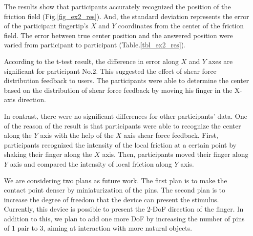 The results show that participants accurately recognized the position of the friction field (Fig.\ref{fig_ex2_res}).
And, the standard deviation represents the error of the participant fingertip's $X$ and $Y$ coordinates from the center of the friction field.
The error between true center position and the answered position were varied from participant to participant (Table.\ref{tbl_ex2_res}).

According to the t-test result, the difference in error along $X$ and $Y$ axes are significant for participant No.2.
This suggested the effect of shear force distribution feedback to users.
The participants were able to determine the center based on the distribution of shear force feedback by moving his finger in the X-axis direction.

In contrast, there were no significant differences for other participants'{} data.
One of the reason of the result is that participants were able to recognize the center along the $ Y $ axis with the help of the $ X $ axis shear force feedback.
First, participants recognized the intensity of the local friction at a certain point by shaking their finger along the $X$ axis.
Then, participants moved their finger along $Y$ axis and compared the intensity of local friction along $Y$ axis.



We are considering two plans as future work. 
The first plan is to make the contact point denser by miniaturization of the pins.
The second plan is to increase the degree of freedom that the device can present the stimulus. 
Currently, this device is possible to present the 2-DoF direction of the finger. In addition to this, we plan to add one more DoF by increasing the number of pins of 1 pair to 3, aiming at interaction with more natural objects.



